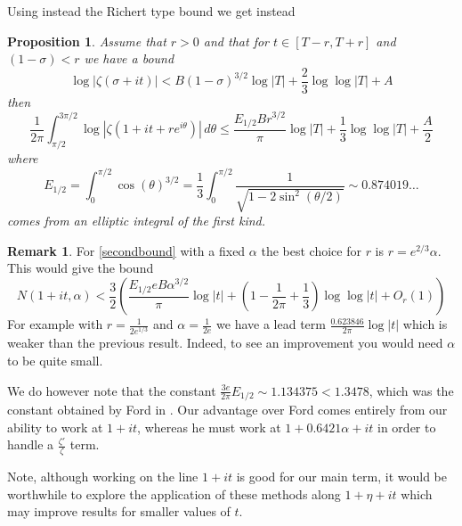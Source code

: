 \documentclass[10pt,english,letter, reqno]{amsart}
\theoremstyle{plain}
\newtheorem{proposition}[theorem]{Proposition}
\theoremstyle{definition}
\newtheorem{remark}[theorem]{Remark}
\begin{document}
Using instead the Richert type bound we get instead
\begin{proposition}\label{prop:Richert}
Assume that $r>0$ and that for $t\in [T-r,T+r]$ and $(1-\sigma)<r$ we have a bound
\[ \log|\zeta(\sigma+it) | < B(1-\sigma)^{3/2}\log|T| + \frac{2}{3} \log\log|T| + A \]
then
\begin{equation}\label{secondbound}
\frac{1}{2\pi}\int_{\pi/2}^{3\pi/2} \log|\zeta(1+it+re^{i\theta})|\,d\theta \leq 
\frac{E_{1/2} Br^{3/2}}{\pi}\log|T| + \frac{1}{3}\log\log|T| + \frac{A}{2}
\end{equation}
where 
\[ E_{1/2} = \int_0^{\pi/2} \cos(\theta)^{3/2}  =  \frac{1}{3} \int_0^{\pi/2} \frac{1}{\sqrt{1-2\sin^2(\theta/2)}} \sim 0.874019\ldots \]
comes from an elliptic integral of the first kind.
\end{proposition}
\begin{remark}
For \eqref{secondbound} with a fixed $\alpha$ the best choice for $r$ is $r=e^{2/3}\alpha$. This would give the bound
\[ N(1+it,\alpha) < 
\frac{3}{2}\left(\frac{ E_{1/2}e B \alpha^{3/2} }{\pi} \log|t| + \left(1-\frac{1}{2\pi} + \frac{1}{3}\right)\log\log|t| + O_r(1) \right)
\]
For example with $r=\frac{1}{2e^{1/3}}$ and $\alpha=\frac{1}{2e}$ we have a lead term $\frac{0.623846}{2\pi}\log|t|$
which is weaker than the previous result.  
Indeed, to  see an improvement you would need $\alpha$ to be quite small.


We do however note that the constant $\frac{3 e}{2 \pi}E_{1/2} \sim 1.134375 < 1.3478$, which was the constant obtained by Ford in \cite[Lemma~4.2]{Ford2002,Ford2019}.
Our advantage over Ford comes entirely from our ability to work at $1+it$, whereas he must work at $1+0.6421\alpha + it$ in order to handle a $\frac{\zeta'}{\zeta}$ term.

Note, although working on the line $1+it$ is good for our main term, it would be worthwhile to explore the application of these methods along $1+\eta + it$ which may improve results for smaller values of $t$.
\end{remark}
\end{document}
